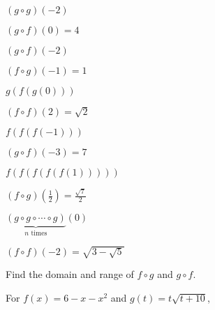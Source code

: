 \documentclass{ximera}
\begin{document}
\begin{question}
$(g \circ g)(-2)$
\begin{solution}
$(g\circ f)(0) = 4$
\end{solution}

\end{question}

\begin{question}
$(g \circ f)(-2)$
\begin{solution}
$(f\circ g)(-1) = 1$
\end{solution}

\end{question}

\begin{question}
$g(f(g(0)))$


\begin{solution}
$(f \circ f)(2) = \sqrt{2}$








\end{solution}

\end{question}

\begin{question}
$f(f(f(-1)))$
\begin{solution}
$(g\circ f)(-3) = 7$
\end{solution}

\end{question}

\begin{question}
$f(f(f(f(f(1)))))$
\begin{solution}
$(f\circ g)\left(\frac{1}{2}\right) = \frac{\sqrt{7}}{2}$
\end{solution}

\end{question}

\begin{question}
$\underbrace{(g \circ g \circ \cdots \circ g)}_{\mbox{$n$ times}}(0)$ 

\begin{solution}
$(f \circ f)(-2) = \sqrt{3 - \sqrt{5}}$





\enlargethispage{0.5in}
\end{solution}

\end{question}

\begin{question}
Find the domain and range of $f \circ g$ and $g \circ f$. 


\begin{solution}
For  $f(x) = 6-x-x^2$ and $g(t) = t\sqrt{t+10}$,



\end{solution}

\end{question}
\end{document}
